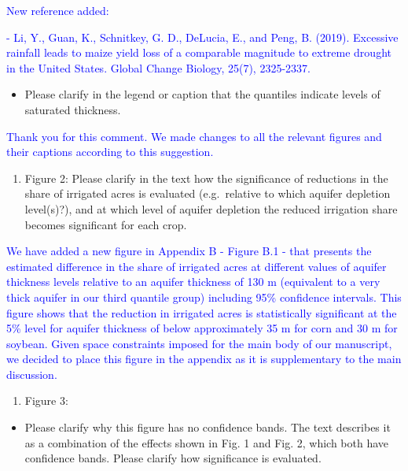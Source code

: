 \documentclass[
]{article}
\providecommand{\tightlist}{%
  \setlength{\itemsep}{0pt}\setlength{\parskip}{0pt}}
\begin{document}
\textcolor{blue}{New reference added:}

\textcolor{blue}{- Li, Y., Guan, K., Schnitkey, G. D., DeLucia, E., and Peng, B. (2019). Excessive rainfall leads to maize yield loss of a comparable magnitude to extreme drought in the United States. Global Change Biology, 25(7), 2325-2337.}

\begin{itemize}
\tightlist
\item
  Please clarify in the legend or caption that the quantiles indicate
  levels of saturated thickness.
\end{itemize}

\textcolor{blue}{Thank you for this comment. We made changes to all the relevant figures and their captions according to this suggestion.}

\begin{enumerate}
\def\labelenumi{\arabic{enumi}.}
\setcounter{enumi}{2}
\tightlist
\item
  Figure 2: Please clarify in the text how the significance of
  reductions in the share of irrigated acres is evaluated (e.g.~relative
  to which aquifer depletion level(s)?), and at which level of aquifer
  depletion the reduced irrigation share becomes significant for each
  crop.
\end{enumerate}

\textcolor{blue}{We have added a new figure in Appendix B - Figure B.1 - that presents the estimated difference in the share of irrigated acres at different values of aquifer thickness levels relative to an aquifer thickness of 130 m (equivalent to a very thick aquifer in our third quantile group) including 95\% confidence intervals. This figure shows that the reduction in irrigated acres is statistically significant at the 5\% level for aquifer thickness of below approximately 35 m for corn and 30 m for soybean. Given space constraints imposed for the main body of our manuscript, we decided to place this figure in the appendix as it is supplementary to the main discussion.}

\begin{enumerate}
\def\labelenumi{\arabic{enumi}.}
\setcounter{enumi}{3}
\tightlist
\item
  Figure 3:
\end{enumerate}

\begin{itemize}
\tightlist
\item
  Please clarify why this figure has no confidence bands. The text
  describes it as a combination of the effects shown in Fig. 1 and Fig.
  2, which both have confidence bands. Please clarify how significance
  is evaluated.
\end{itemize}
\end{document}
